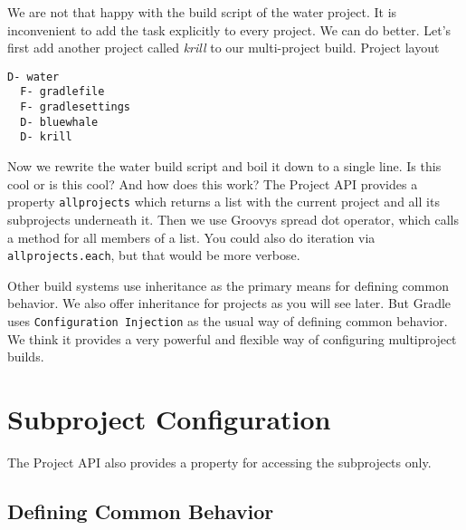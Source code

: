 We are not that happy with the build script of the water project. It is inconvenient to add the task explicitly to every project. We can do better. Let's first add another project called \emph{krill} to our multi-project build.
Project layout

\begin{minipage}[t]{7cm}
\begin{Verbatim}[frame=single,label=Project Tree]
D- water
  F- gradlefile
  F- gradlesettings
  D- bluewhale
  D- krill	
\end{Verbatim}
\end{minipage}	
\begin{minipage}[t]{9cm}
\end{minipage}

\noindent Now we rewrite the water build script and boil it down to a single line.
Is this cool or is this cool? And how does this work? The Project API provides a property \texttt{allprojects} which returns a list with the current project and all its subprojects underneath it. Then we use Groovys spread dot operator, which calls a method for all members of a list. You could also do iteration via \texttt{allprojects.each}, but that would be more verbose.

\begin{graybox}
Other build systems use inheritance as the primary means for defining common behavior. We also offer inheritance for projects as you will see later. But Gradle uses \texttt{Configuration Injection} as the usual way of defining common behavior. We think it provides a very powerful and flexible way of configuring multiproject builds.	
\end{graybox}

\section{Subproject Configuration} %
\label{sec:subproject_configuration}
\noindent The Project API also provides a property for accessing the subprojects only. 

\subsection{Defining Common Behavior} %
\label{sub:defining_common_behavior}

